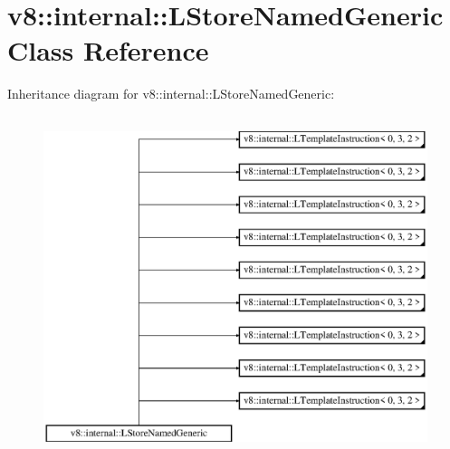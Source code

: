\hypertarget{classv8_1_1internal_1_1_l_store_named_generic}{}\section{v8\+:\+:internal\+:\+:L\+Store\+Named\+Generic Class Reference}
\label{classv8_1_1internal_1_1_l_store_named_generic}
Inheritance diagram for v8\+:\+:internal\+:\+:L\+Store\+Named\+Generic\+:\begin{figure}[H]
\begin{center}
\leavevmode
\includegraphics[height=10.000000cm]{classv8_1_1internal_1_1_l_store_named_generic}
\end{center}
\end{figure}
